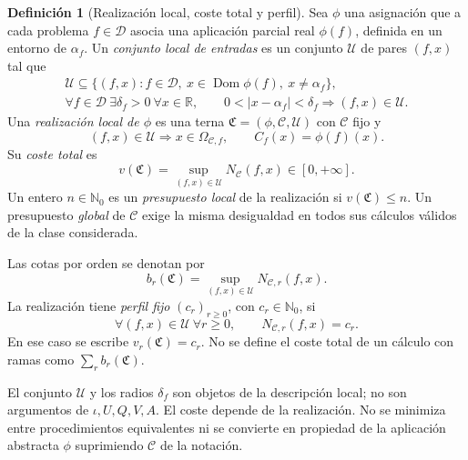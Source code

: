 \documentclass[11pt,a4paper]{article}
\numberwithin{equation}{section}
\theoremstyle{definition}
\newtheorem{definition}[theorem]{Definición}
\theoremstyle{remark}
\newcommand{\R}{\mathbb R}
\newcommand{\Nn}{\mathbb N_0}
\newcommand{\DD}{\mathcal D}
\DeclareMathOperator{\Dom}{Dom}
\begin{document}
\begin{definition}[Realización local, coste total y perfil]\label{def:realizedcost}\label{def:operative}
Sea $\phi$ una asignación que a cada problema $f\in\DD$ asocia una aplicación parcial real $\phi(f)$, definida en un entorno de $\alpha_f$. Un \emph{conjunto local de entradas} es un conjunto $\mathcal U$ de pares $(f,x)$ tal que
\begin{equation}\label{eq:localset}
\begin{gathered}
\mathcal U\subseteq\{(f,x):f\in\DD,\ x\in\Dom\phi(f),\ x\ne\alpha_f\},\\
\forall f\in\DD\ \exists\delta_f>0\ \forall x\in\R,\qquad
0<|x-\alpha_f|<\delta_f\Longrightarrow(f,x)\in\mathcal U.
\end{gathered}
\end{equation}
Una \emph{realización local de $\phi$} es una terna $\mathfrak C=(\phi,\mathscr C,\mathcal U)$ con $\mathscr C$ fijo y
\begin{equation}\label{eq:realization}
(f,x)\in\mathcal U\Longrightarrow x\in\Omega_{\mathscr C,f},\qquad C_f(x)=\phi(f)(x).
\end{equation}
Su \emph{coste total} es
\begin{equation}\label{eq:realizedcost}
v(\mathfrak C)=\sup_{(f,x)\in\mathcal U}N_{\mathscr C}(f,x)\in[0,+\infty].
\end{equation}
Un entero $n\in\Nn$ es un \emph{presupuesto local} de la realización si $v(\mathfrak C)\le n$. Un presupuesto \emph{global} de $\mathscr C$ exige la misma desigualdad en todos sus cálculos válidos de la clase considerada.

Las cotas por orden se denotan por
\[
b_r(\mathfrak C)=\sup_{(f,x)\in\mathcal U}N_{\mathscr C,r}(f,x).
\]
La realización tiene \emph{perfil fijo} $(c_r)_{r\ge0}$, con $c_r\in\Nn$, si
\[
\forall(f,x)\in\mathcal U\ \forall r\ge0,\qquad N_{\mathscr C,r}(f,x)=c_r.
\]
En ese caso se escribe $v_r(\mathfrak C)=c_r$. No se define el coste total de un cálculo con ramas como $\sum_r b_r(\mathfrak C)$.

El conjunto $\mathcal U$ y los radios $\delta_f$ son objetos de la descripción local; no son argumentos de $\iota,U,Q,V,A$. El coste depende de la realización. No se minimiza entre procedimientos equivalentes ni se convierte en propiedad de la aplicación abstracta $\phi$ suprimiendo $\mathscr C$ de la notación.
\end{definition}
\end{document}
